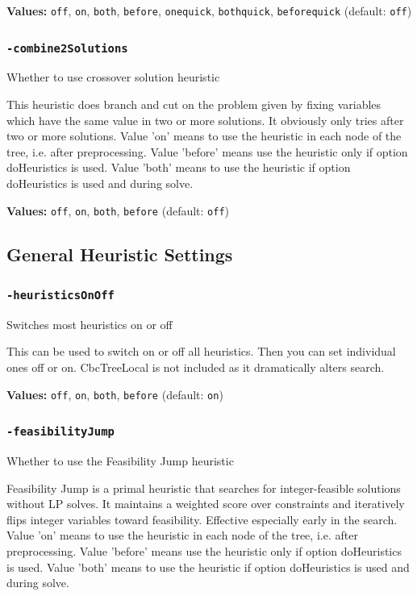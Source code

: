 \documentclass[11pt,a4paper]{article}
\begin{document}
\textbf{Values:} \texttt{off}, \texttt{on}, \texttt{both}, \texttt{before}, \texttt{onequick}, \texttt{bothquick}, \texttt{beforequick} (default: \texttt{off})

\subsubsection*{\texttt{-combine2Solutions}}

Whether to use crossover solution heuristic

This heuristic does branch and cut on the problem given by fixing variables which have the same value in two or more solutions. It obviously only tries after two or more solutions. Value 'on' means to use the heuristic in each node of the tree, i.e. after preprocessing. Value 'before' means use the heuristic only if option doHeuristics is used. Value 'both' means to use the heuristic if option doHeuristics is used and during solve.

\textbf{Values:} \texttt{off}, \texttt{on}, \texttt{both}, \texttt{before} (default: \texttt{off})

\subsection{General Heuristic Settings}

\subsubsection*{\texttt{-heuristicsOnOff}}

Switches most heuristics on or off

This can be used to switch on or off all heuristics.  Then you can set individual ones off or on.  CbcTreeLocal is not included as it dramatically alters search.

\textbf{Values:} \texttt{off}, \texttt{on}, \texttt{both}, \texttt{before} (default: \texttt{on})

\subsubsection*{\texttt{-feasibilityJump}}

Whether to use the Feasibility Jump heuristic

Feasibility Jump is a primal heuristic that searches for integer-feasible solutions without LP solves. It maintains a weighted score over constraints and iteratively flips integer variables toward feasibility. Effective especially early in the search. Value 'on' means to use the heuristic in each node of the tree, i.e. after preprocessing. Value 'before' means use the heuristic only if option doHeuristics is used. Value 'both' means to use the heuristic if option doHeuristics is used and during solve.
\end{document}
